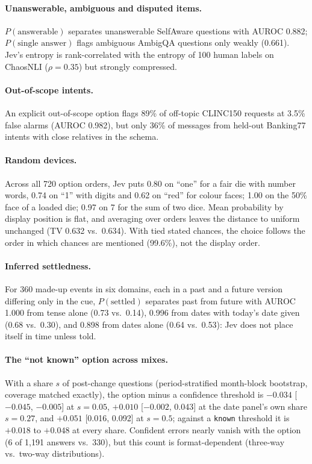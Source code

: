 \documentclass[10pt,twocolumn]{article}
\begin{document}
\paragraph{Unanswerable, ambiguous and disputed items.} $P(\text{answerable})$
separates unanswerable SelfAware questions with AUROC 0.882; $P(\text{single
answer})$ flags ambiguous AmbigQA questions only weakly (0.661). Jev's entropy
is rank-correlated with the entropy of 100 human labels on ChaosNLI
($\rho=0.35$) but strongly compressed.

\paragraph{Out-of-scope intents.} An explicit out-of-scope option flags 89\%
of off-topic CLINC150 requests at 3.5\% false alarms (AUROC 0.982), but only
36\% of messages from held-out Banking77 intents with close relatives in the
schema.

\paragraph{Random devices.} Across all 720 option orders, Jev puts 0.80 on
``one'' for a fair die with number words, 0.74 on ``1'' with digits and 0.62
on ``red'' for colour faces; 1.00 on the 50\% face of a loaded die; 0.97 on 7
for the sum of two dice. Mean probability by display position is flat, and
averaging over orders leaves the distance to uniform unchanged (TV 0.632 vs.\
0.634). With tied stated chances, the choice follows the order in which chances
are mentioned (99.6\%), not the display order.

\paragraph{Inferred settledness.} For 360 made-up events in six domains, each
in a past and a future version differing only in the cue, $P(\text{settled})$
separates past from future with AUROC 1.000 from tense alone (0.73 vs.\ 0.14),
0.996 from dates with today's date given (0.68 vs.\ 0.30), and 0.898 from dates
alone (0.64 vs.\ 0.53): Jev does not place itself in time unless told.

\paragraph{The ``not known'' option across mixes.} With a share $s$ of
post-change questions (period-stratified month-block bootstrap, coverage
matched exactly), the option minus a confidence threshold is $-0.034$
[$-0.045$, $-0.005$] at $s=0.05$, $+0.010$ [$-0.002$, 0.043] at the date panel's
own share $s=0.27$, and $+0.051$ [0.016, 0.092] at $s=0.5$; against a
\texttt{known} threshold it is $+0.018$ to $+0.048$ at every share. Confident
errors nearly vanish with the option (6 of 1{,}191 answers vs.\ 330), but this
count is format-dependent (three-way vs.\ two-way distributions).
\end{document}
